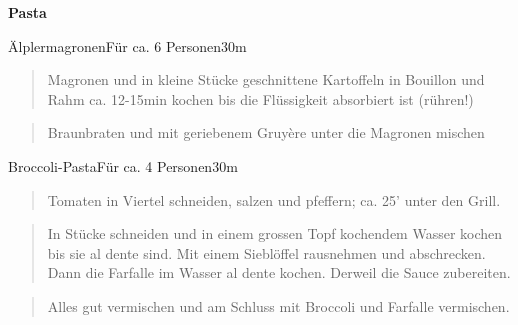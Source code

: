 \documentclass[
  a4paper,
]{article}
\begin{document}
\newpage
\vspace*{\fill}

\textbf{\Huge \sf Pasta} \vspace*{\fill} \thispagestyle{empty} \newpage

\begin{recipe}{Älplermagronen}{Für ca. 6 Personen}{30m}


\begin{quote}
Magronen und in kleine Stücke geschnittene Kartoffeln in Bouillon und
Rahm ca. 12-15min kochen bis die Flüssigkeit absorbiert ist (rühren!)
\end{quote}

\freeform\hrulefill


\begin{quote}
Braunbraten und mit geriebenem Gruyère unter die Magronen mischen
\end{quote}

\freeform\hrulefill\newline\freeform{}\end{recipe}

\newpage

\begin{recipe}{Broccoli-Pasta}{Für ca. 4 Personen}{30m}


\begin{quote}
Tomaten in Viertel schneiden, salzen und pfeffern; ca. 25' unter den
Grill.
\end{quote}

\freeform\hrulefill


\begin{quote}
In Stücke schneiden und in einem grossen Topf kochendem Wasser kochen
bis sie al dente sind. Mit einem Sieblöffel rausnehmen und abschrecken.
Dann die Farfalle im Wasser al dente kochen. Derweil die Sauce
zubereiten.
\end{quote}

\freeform\hrulefill


\begin{quote}
Alles gut vermischen und am Schluss mit Broccoli und Farfalle
vermischen.
\end{quote}

\freeform\hrulefill\newline\freeform{}\end{recipe}
\end{document}
